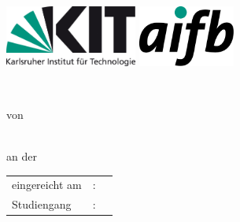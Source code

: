 \begin{titlepage}
	\begin{addmargin}{-2cm}
    \includegraphics[height=2cm]{images/kit.jpg}
    \hfill
    \includegraphics[height=2cm]{images/aifb.png}
    \begin{center}
        \large  
		
        \vfill
        
        \LARGE {\spacedallcaps \myTitle} \\
        
        \vfill
        
        \large \myTypeOfWork von \\ %
        \smallskip
        \large \spacedallcaps{\myName} \\ 
        
        \vfill
        
        \large an der \myDepartment \\ %
        \vspace{0.5cm}
        \begin{tabular}{lll}
        	  eingereicht am & : & \myTime \\
        	  Studiengang & : & \myCourse \\
        \end{tabular}

        \vfill
        
        \myInstitute \\
		\myUni
    \end{center}  
  \end{addmargin}       
\end{titlepage}   